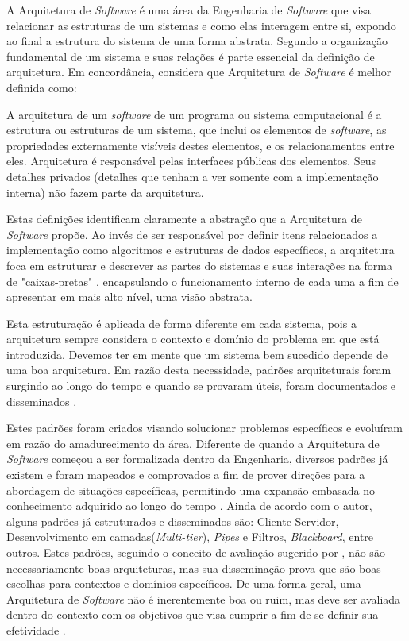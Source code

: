 A Arquitetura de \textit{Software} é uma área da Engenharia de \textit{Software} que visa relacionar as estruturas de um sistemas e como elas interagem entre si, expondo ao final a estrutura do sistema de uma forma abstrata. Segundo \cite{ieeeSE} a organização fundamental de um sistema e suas relações é parte essencial da definição de arquitetura. Em concordância, \cite{lesBass2012} considera que Arquitetura de \textit{Software} é melhor definida como:

\begin{citacaodireta}
A arquitetura de um \textit{software} de um programa ou sistema computacional é a estrutura ou estruturas de um sistema, que inclui os elementos de \textit{software}, as propriedades externamente visíveis destes elementos, e os relacionamentos entre eles. Arquitetura é responsável pelas interfaces públicas dos elementos. Seus detalhes privados (detalhes que tenham a ver somente com a implementação interna) não fazem parte da arquitetura.
\cite{lesBass2012}
\end{citacaodireta}

Estas definições identificam claramente a abstração que a Arquitetura de \textit{Software} propõe. Ao invés de ser responsável por definir itens relacionados a implementação como algoritmos e estruturas de dados específicos, a arquitetura foca em estruturar e descrever as partes do sistemas e suas interações na forma de "caixas-pretas" \cite{lesBass2012}, encapsulando o funcionamento interno de cada uma a fim de apresentar em mais alto nível, uma visão abstrata. 

Esta estruturação é aplicada de forma diferente em cada sistema, pois a arquitetura sempre considera o contexto e domínio do problema em que está introduzida. Devemos ter em mente que um sistema bem sucedido depende de uma boa arquitetura. Em razão desta necessidade, padrões arquiteturais foram surgindo ao longo do tempo e quando se provaram úteis, foram documentados e disseminados \cite{lesBass2012}.

Estes padrões foram criados visando solucionar problemas específicos e evoluíram em razão do amadurecimento da área. Diferente de quando a Arquitetura de \textit{Software} começou a ser formalizada dentro da Engenharia, diversos padrões já existem e foram mapeados e comprovados a fim de prover direções para a abordagem de situações específicas, permitindo uma expansão embasada no conhecimento adquirido ao longo do tempo \cite{sommer07}. Ainda de acordo com o autor, alguns padrões já estruturados e disseminados são: Cliente-Servidor, Desenvolvimento em camadas(\textit{Multi-tier}), \textit{Pipes} e Filtros, \textit{Blackboard}, entre outros. Estes padrões, seguindo o conceito de avaliação sugerido por \cite{lesBass2012}, não são necessariamente boas arquiteturas, mas sua disseminação prova que são boas escolhas para contextos e domínios específicos. De uma forma geral, uma Arquitetura de \textit{Software} não é inerentemente boa ou ruim, mas deve ser avaliada dentro do contexto com os objetivos que visa cumprir a fim de se definir sua efetividade \cite{lesBass2012}.

